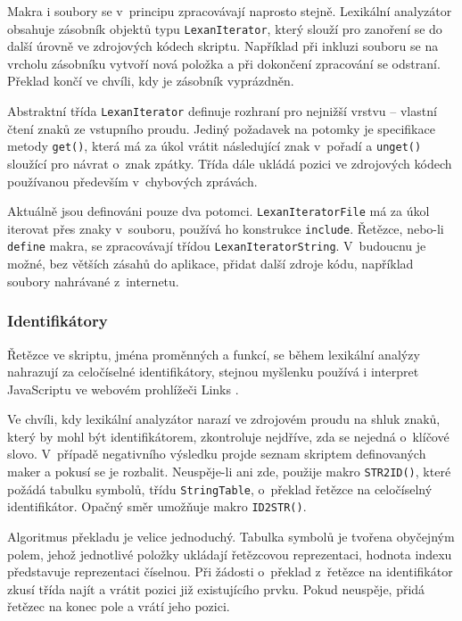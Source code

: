 \documentclass[11pt,twoside,a4paper]{book}
\begin{document}
Makra i soubory se v~principu zpracovávají naprosto stejně. Lexikální analyzátor obsahuje zásobník objektů typu \texttt{LexanIterator}, který slouží pro zanoření se do další úrovně ve zdrojových kódech skriptu. Například při inkluzi souboru se na vrcholu zásobníku vytvoří nová položka a při dokončení zpracování se odstraní. Překlad končí ve chvíli, kdy je zásobník vyprázdněn.

Abstraktní třída \texttt{LexanIterator} definuje rozhraní pro nejnižší vrstvu -- vlastní čtení znaků ze vstupního proudu. Jediný požadavek na potomky je specifikace metody \texttt{get()}, která má za úkol vrátit následující znak v~pořadí a \texttt{unget()} sloužící pro návrat o~znak zpátky. Třída dále ukládá pozici ve zdrojových kódech používanou především v~chybových zprávách.

Aktuálně jsou definováni pouze dva potomci. \texttt{LexanIteratorFile} má za úkol iterovat přes znaky v~souboru, používá ho konstrukce \texttt{include}. Řetězce, nebo-li \texttt{define} makra, se zpracovávají třídou \texttt{Le\-xan\-Ite\-ra\-tor\-String}. V~budoucnu je možné, bez větších zásahů do aplikace, přidat další zdroje kódu, například soubory nahrávané z~internetu.


\subsubsection{Identifikátory}
\label{identifikatory}

Řetězce ve skriptu, jména proměnných a funkcí, se během lexikální analýzy nahrazují za celočíselné identifikátory, stejnou myšlenku používá i interpret JavaScriptu ve webovém pro\-hlí\-že\-či Links \cite[str. 25]{links}.

Ve chvíli, kdy lexikální analyzátor narazí ve zdrojovém proudu na shluk znaků, který by mohl být identifikátorem, zkontroluje nejdříve, zda se nejedná o~klíčové slovo. V~případě negativního výsledku projde seznam skriptem definovaných maker a pokusí se je rozbalit. Neuspěje-li ani zde, použije makro \texttt{STR2ID()}, které požádá tabulku symbolů, třídu \texttt{StringTable}, o~překlad řetězce na celočíselný identifikátor. Opačný směr umožňuje makro \texttt{ID2STR()}.

Algoritmus překladu je velice jednoduchý. Tabulka symbolů je tvořena obyčejným polem, jehož jednotlivé položky ukládají řetězcovou reprezentaci, hodnota indexu představuje reprezentaci číselnou. Při žádosti o~překlad z~řetězce na identifikátor zkusí třída najít a vrátit pozici již existujícího prvku. Pokud neuspěje, přidá řetězec na konec pole a vrátí jeho pozici.
\end{document}
